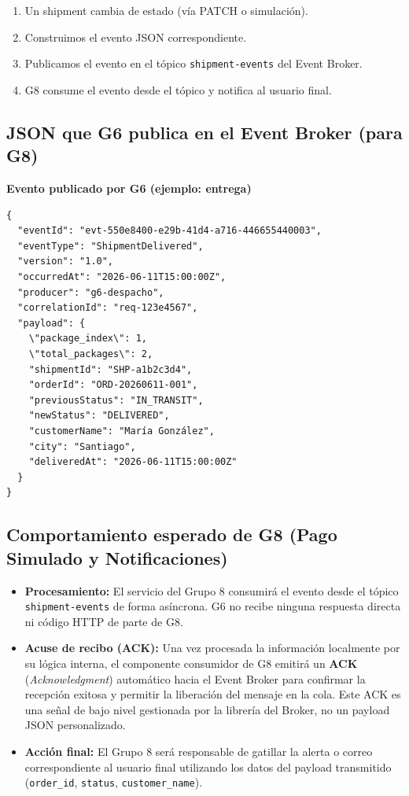 \documentclass[11pt, a4paper]{article}
\newcommand{\contractheader}[1]{%
  \noindent\colorbox{primary!10}{%
    \parbox{\dimexpr\textwidth-2\fboxsep}{%
      \textbf{\faFileCode\quad #1}%
    }%
  }
  \vspace{0.3cm}
}
\begin{document}
\begin{enumerate}[noitemsep]
  \item Un shipment cambia de estado (vía PATCH o simulación).
  \item Construimos el evento JSON correspondiente.
  \item Publicamos el evento en el tópico \texttt{shipment-events} del Event Broker.
  \item G8 consume el evento desde el tópico y notifica al usuario final.
\end{enumerate}

\subsection{JSON que G6 publica en el Event Broker (para G8)}

\contractheader{Evento publicado por G6 (ejemplo: entrega)}

\begin{lstlisting}
{
  "eventId": "evt-550e8400-e29b-41d4-a716-446655440003",
  "eventType": "ShipmentDelivered",
  "version": "1.0",
  "occurredAt": "2026-06-11T15:00:00Z",
  "producer": "g6-despacho",
  "correlationId": "req-123e4567",
  "payload": {
    \"package_index\": 1,
    \"total_packages\": 2,
    "shipmentId": "SHP-a1b2c3d4",
    "orderId": "ORD-20260611-001",
    "previousStatus": "IN_TRANSIT",
    "newStatus": "DELIVERED",
    "customerName": "María González",
    "city": "Santiago",
    "deliveredAt": "2026-06-11T15:00:00Z"
  }
}
\end{lstlisting}

\subsection{Comportamiento esperado de G8 (Pago Simulado y Notificaciones)}

\begin{itemize}[noitemsep]
  \item \textbf{Procesamiento:} El servicio del Grupo 8 consumirá el evento
    desde el tópico \texttt{shipment-events} de forma asíncrona. G6 no recibe
    ninguna respuesta directa ni código HTTP de parte de G8.
  \item \textbf{Acuse de recibo (ACK):} Una vez procesada la información
    localmente por su lógica interna, el componente consumidor de G8 emitirá un
    \textbf{ACK} (\textit{Acknowledgment}) automático hacia el Event Broker para
    confirmar la recepción exitosa y permitir la liberación del mensaje en la
    cola. Este ACK es una señal de bajo nivel gestionada por la librería del
    Broker, no un payload JSON personalizado.
  \item \textbf{Acción final:} El Grupo 8 será responsable de gatillar la
    alerta o correo correspondiente al usuario final utilizando los datos del
    payload transmitido (\texttt{order\_id}, \texttt{status},
    \texttt{customer\_name}).
\end{itemize}
\end{document}
